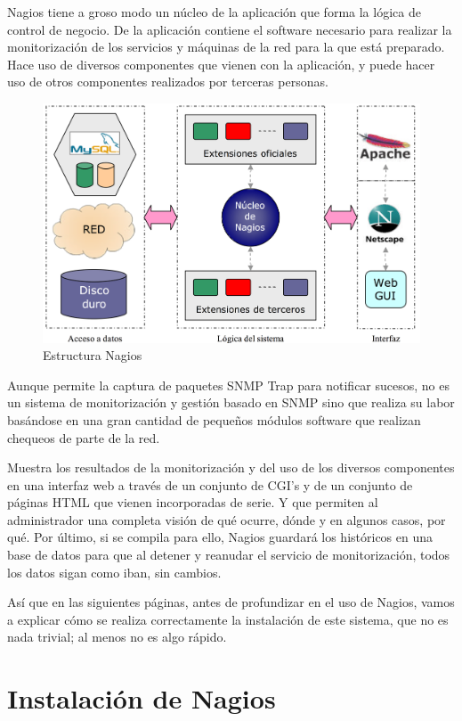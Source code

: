 \documentclass[11pt,a4paper]{article}
\begin{document}
Nagios tiene a groso modo un núcleo de la aplicación que forma la lógica de control de negocio. De la aplicación contiene el software necesario para realizar la monitorización de los servicios y máquinas de la red para la que está preparado. Hace uso de diversos componentes que vienen con la aplicación, y puede hacer uso de otros componentes realizados por terceras personas.

\begin{figure}[hbtp]
\centerline{\includegraphics[width=12cm]{images/nagiosCore.png}}
\caption{Estructura Nagios}
\label{figuraEstructuraNagios}
\end{figure}

Aunque permite la captura de paquetes SNMP Trap para notificar sucesos, no es un sistema de monitorización y gestión basado en SNMP sino que realiza su labor basándose en una gran cantidad de pequeños módulos software que realizan chequeos de parte de la red.

Muestra los resultados de la monitorización y del uso de los diversos componentes en una interfaz web a través de un conjunto de CGI’s y de un conjunto de páginas HTML que vienen incorporadas de serie. Y que permiten al administrador una completa visión de qué ocurre, dónde y en algunos casos, por qué.
Por último, si se compila para ello, Nagios guardará los históricos en una base de datos para que al detener y reanudar el servicio de monitorización, todos los datos sigan como iban, sin cambios.

Así que en las siguientes páginas, antes de profundizar en el uso de Nagios, vamos a explicar cómo se realiza correctamente la instalación de este sistema, que no es nada trivial; al menos no es algo rápido.

\section{Instalación de Nagios}
\end{document}
